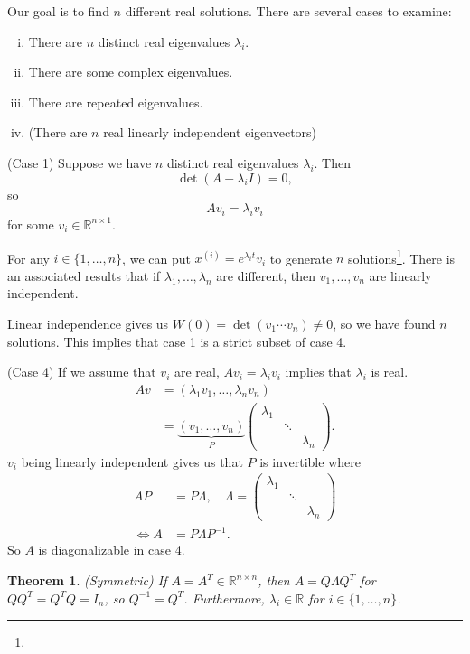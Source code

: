 \documentclass{tufte-handout}
\newcommand*\R{\mathbb{R}}
\newtheorem{thm}{Theorem}[subsection]
\theoremstyle{definition}
\begin{document}
Our goal is to find $n$ different real solutions. There are several cases to examine:
\begin{enumerate}[(i)]
	\item There are $n$ distinct real eigenvalues $\lambda_i$.
	\item There are some complex eigenvalues.
	\item There are repeated eigenvalues.
	\item (There are $n$ real linearly independent eigenvectors)
\end{enumerate}

(Case 1) Suppose we have $n$ distinct real eigenvalues $\lambda_i$. Then \[
	\det(A-\lambda_i I) = 0
,\] so \[
	A v_i = \lambda_i v_i
\] for some $v_i \in \R^{n \times 1}$.

For any $i \in \{1,\ldots,n\}$, we can put $x^{(i)} = e^{\lambda_i t}v_i$ to generate $n$ solutions\footnote{}. There is an associated results that if $\lambda_1,\ldots,\lambda_n$ are different, then $v_1,\ldots,v_n$ are linearly independent.

Linear independence gives us $W(0) = \det(v_1 \cdots v_n) \ne 0$, so we have found $n$ solutions. This implies that case 1 is a strict subset of case 4. 

(Case 4) If we assume that $v_i$ are real, $Av_i = \lambda_i v_i$ implies that $\lambda_i$ is real.
\begin{align*}
	Av &= (\lambda_1 v_1, \ldots,\lambda_n v_n) \\
	   &= \underbrace{(v_1,\ldots,v_n)}_{P} \begin{pmatrix}
		\lambda_1 & & \\
				  & \ddots & \\
				  & & \lambda_n
	\end{pmatrix}
.\end{align*}
$v_i$ being linearly independent gives us that $P$ is invertible where
\begin{align*}
	AP &= P \Lambda, \quad \Lambda = \begin{pmatrix}
		\lambda_1 & & \\
				  & \ddots & \\
				  & & \lambda_n
	\end{pmatrix} \\
		\iff A &= P \Lambda P^{-1}
.\end{align*}
So $A$ is diagonalizable in case 4.

\begin{thm}
	(Symmetric) If $A = A^T \in \R^{n \times  n}$, then $A = Q \Lambda Q^T$ for $Q Q^T = Q^T Q = I_n$, so $Q^{-1} = Q^T$. Furthermore, $\lambda_i \in \R$ for $i \in \{1,\ldots,n\}$.

\end{thm}
\end{document}

